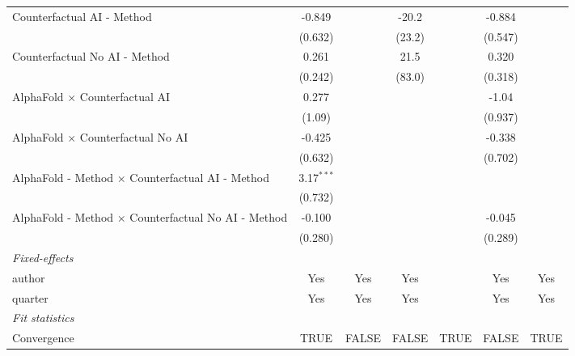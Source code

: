 \begin{tabular}{lcccccc}
   Counterfactual AI - Method                                 & -0.849       &         & -20.2         &      & -0.884  &   \\   
                                                              & (0.632)      &         & (23.2)        &      & (0.547) &   \\   
   Counterfactual No AI - Method                              & 0.261        &         & 21.5          &      & 0.320   &   \\   
                                                              & (0.242)      &         & (83.0)        &      & (0.318) &   \\   
   AlphaFold $\times$ Counterfactual AI                       & 0.277        &         &               &      & -1.04   &   \\   
                                                              & (1.09)       &         &               &      & (0.937) &   \\   
   AlphaFold $\times$ Counterfactual No AI                    & -0.425       &         &               &      & -0.338  &   \\   
                                                              & (0.632)      &         &               &      & (0.702) &   \\   
   AlphaFold - Method $\times$ Counterfactual AI - Method     & 3.17$^{***}$ &         &               &      &         &   \\   
                                                              & (0.732)      &         &               &      &         &   \\   
   AlphaFold - Method $\times$ Counterfactual No AI - Method  & -0.100       &         &               &      & -0.045  &   \\   
                                                              & (0.280)      &         &               &      & (0.289) &   \\   
   \midrule
   \emph{Fixed-effects}\\
   author                                                     & Yes          & Yes     & Yes           &      & Yes     & Yes\\  
   quarter                                                    & Yes          & Yes     & Yes           &      & Yes     & Yes\\  
   \midrule
   \emph{Fit statistics}\\
   Convergence                                                &TRUE          & FALSE   & FALSE         & TRUE & FALSE   & TRUE\\  

\end{tabular}
